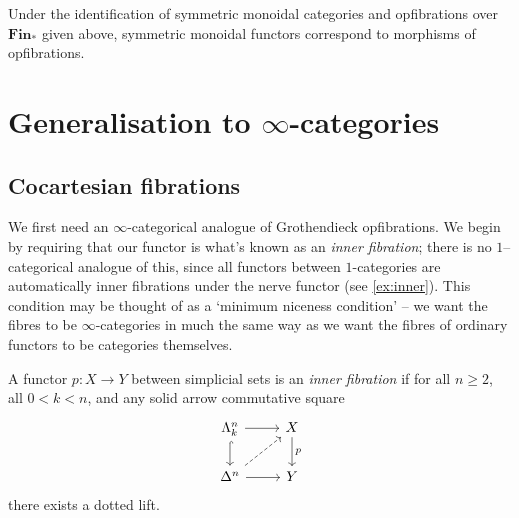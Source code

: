 \documentclass{MetricNotes2023}
\begin{document}
\begin{proposition}
Under the identification of symmetric monoidal categories and opfibrations over \(\textbf{Fin}_*\) given above, symmetric monoidal functors correspond to morphisms of opfibrations.
\end{proposition}

\section{Generalisation to \(\infty\)-categories}


\subsection{Cocartesian fibrations}

We first need an \(\infty\)-categorical analogue of Grothendieck opfibrations. We begin by requiring that our functor is what's known as an \textit{inner fibration}; there is no \(1\)--categorical analogue of this, since all functors between \(1\)-categories are automatically inner fibrations under the nerve functor (see \ref{ex:inner}). This condition may be thought of as a `minimum niceness condition' -- we want the fibres to be \(\infty\)-categories in much the same way as we want the fibres of ordinary functors to be categories themselves. 

\begin{definition}
A functor \(p : X \to Y\) between simplicial sets is an \textit{inner fibration} if for all \(n \geq 2\), all \(0 < k < n\), and any solid arrow commutative square 
\[\begin{tikzcd}
\Lambda^n_k \arrow[r, ""] \arrow[d, hookrightarrow, swap, ""]  & X \arrow[d, "p"]  \\
\Delta^n \arrow[r, swap, ""] \arrow[ur, dashrightarrow, swap, ""]  & Y
\end{tikzcd}\]
there exists a dotted lift. 
\end{definition}
\end{document}
